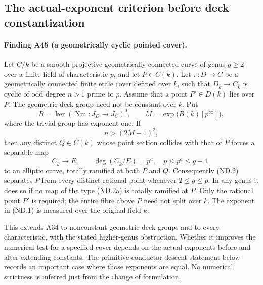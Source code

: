 \subsection{The actual-exponent criterion before deck constantization}
\label{sec:nonconstant-deck-exponent}

\paragraph{Finding A45 (a geometrically cyclic pointed cover).}
Let $C/k$ be a smooth projective geometrically connected
curve of genus $g\ge2$ over a finite field of characteristic $p$,
and let $P\in C(k)$.
Let $\pi:D\to C$ be a geometrically connected finite etale cover
defined over $k$, such that $D_{\bar k}\to C_{\bar k}$ is cyclic
of odd degree $n>1$ prime to $p$. Assume that a point $P'\in D(k)$ lies over $P$.
The geometric deck group need not be constant over $k$. Put
\[
 B=\ker(\operatorname{Nm}:J_D\longrightarrow J_C)^0,
 \qquad M=\exp\bigl(B(k)[p^\infty]\bigr),
 \tag{ND.1}
\]
where the trivial group has exponent one. If
\[
                         n>(2M-1)^2,
 \tag{ND.2}
\]
then any distinct $Q\in C(k)$ whose point section collides with
that of $P$ forces a separable map
\[
 C_{\bar k}\longrightarrow E,\qquad
 \deg(C_{\bar k}/E)=p^a,\quad p\le p^a\le g-1,
 \tag{ND.2a}
\]
to an elliptic curve, totally ramified at both $P$ and $Q$.
Consequently (ND.2) separates $P$ from every distinct rational
point whenever $2\le g\le p$. In any genus it does so if no
map of the type (ND.2a) is totally ramified at $P$.
Only the rational point $P'$ is required; the entire fibre above
$P$ need not split over $k$. The exponent in (ND.1) is measured
over the original field $k$.

This extends A34 to nonconstant geometric deck groups and to
every characteristic, with the stated higher-genus obstruction. Whether it improves the numerical test for a specified
cover depends on the actual exponents before and after extending
constants. The primitive-conductor descent statement below records
an important case where those exponents are equal. No numerical
strictness is inferred just from the change of formulation.

